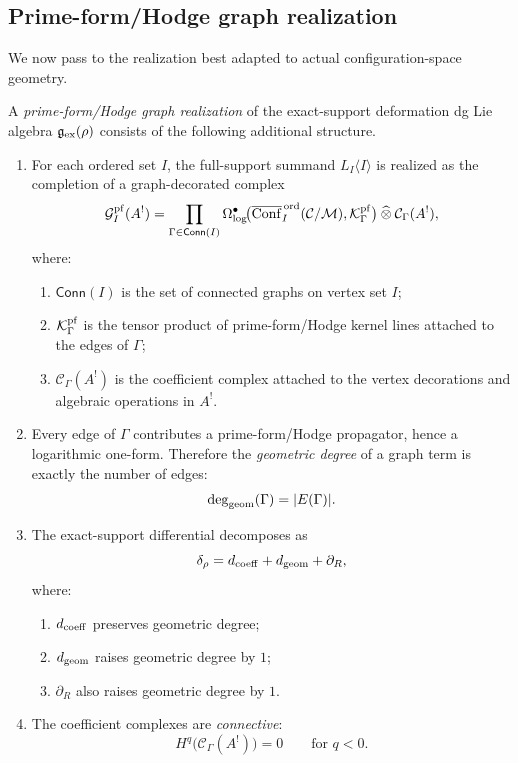\subsection{Prime-form/Hodge graph realization}

We now pass to the realization best adapted to actual configuration-space geometry.

\begin{definition}
\label{def:prime-form-hodge-graph-realization}
A \emph{prime-form/Hodge graph realization} of the exact-support deformation dg Lie algebra
$\mathfrak g_{\mathrm{ex}}(\rho)$ consists of the following additional structure.

\begin{enumerate}
\item
For each ordered set $I$, the full-support summand $L_I\langle I\rangle$ is realized as the completion
of a graph-decorated complex
\[
\mathcal G_I^{\mathrm{pf}}(A^!)
=
\prod_{\Gamma\in \mathsf{Conn}(I)}
\Omega^\bullet_{\log}\!\bigl(\overline{\operatorname{Conf}}^{\,\mathrm{ord}}_I(\mathcal C/\mathcal M),
\mathcal K_\Gamma^{\mathrm{pf}}\bigr)
\mathbin{\widehat{\otimes}}
\mathcal C_\Gamma(A^!),
\]
where:
\begin{enumerate}
\item
$\mathsf{Conn}(I)$ is the set of connected graphs on vertex set $I$;
\item
$\mathcal K_\Gamma^{\mathrm{pf}}$ is the tensor product of prime-form/Hodge kernel lines attached to the edges of
$\Gamma$;
\item
$\mathcal C_\Gamma(A^!)$ is the coefficient complex attached to the vertex decorations and algebraic
operations in $A^!$.
\end{enumerate}

\item
Every edge of $\Gamma$ contributes a prime-form/Hodge propagator, hence a logarithmic one-form.
Therefore the \emph{geometric degree} of a graph term is exactly the number of edges:
\[
\deg_{\mathrm{geom}}(\Gamma)=|E(\Gamma)|.
\]

\item
The exact-support differential decomposes as
\[
\delta_\rho
=
d_{\mathrm{coeff}}+d_{\mathrm{geom}}+\partial_R,
\]
where:
\begin{enumerate}
\item
$d_{\mathrm{coeff}}$ preserves geometric degree;
\item
$d_{\mathrm{geom}}$ raises geometric degree by $1$;
\item
$\partial_R$ also raises geometric degree by $1$.
\end{enumerate}

\item
The coefficient complexes are \emph{connective}:
\[
H^q\bigl(\mathcal C_\Gamma(A^!)\bigr)=0
\qquad\text{for }q<0.
\]
\end{enumerate}
\end{definition}

